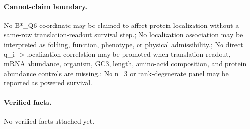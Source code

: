 \paragraph{Cannot-claim boundary.} No B*\_Q6 coordinate may be claimed to affect protein localization without a same-row translation-readout survival step.; No localization association may be interpreted as folding, function, phenotype, or physical admissibility.; No direct q\_i -> localization correlation may be promoted when translation readout, mRNA abundance, organism, GC3, length, amino-acid composition, and protein abundance controls are missing.; No n=3 or rank-degenerate panel may be reported as powered survival.

\paragraph{Verified facts.}
No verified facts attached yet.


